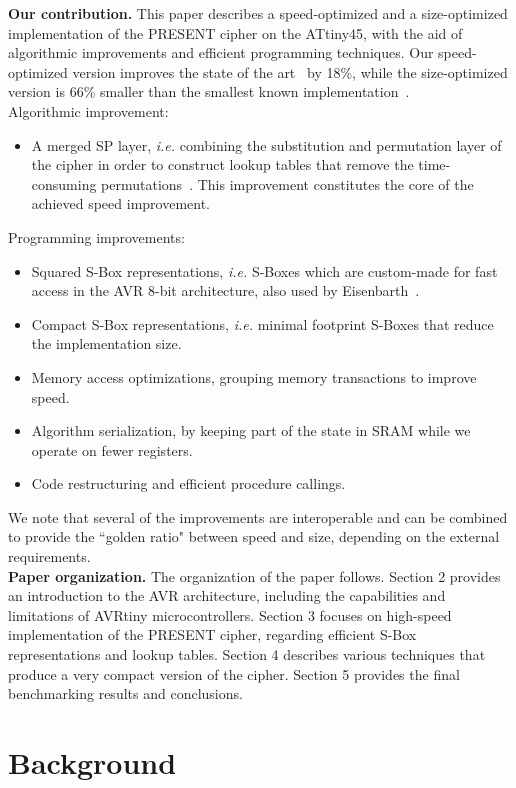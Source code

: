 \documentclass[11pt]{article}
\begin{document}
\textbf{Our contribution.} This paper describes a speed-optimized and a size-optimized implementation of the PRESENT cipher on the ATtiny45, with the aid of algorithmic improvements and efficient programming techniques. Our speed-optimized version improves the state of the art~\cite{eisenbarth2012compact} by 18\%, while the size-optimized version is 66\% smaller than the smallest known implementation~\cite{eisenbarth2012compact}.\\
Algorithmic improvement:
\begin{itemize}[nolistsep]
  \item A merged SP layer, \emph{i.e.} combining the substitution and permutation layer of the cipher in order to construct lookup tables that remove the time-consuming permutations~\cite{gong_code}. This improvement constitutes the core of the achieved speed improvement.
\end{itemize}
Programming improvements:
\begin{itemize}[nolistsep]
  \item Squared S-Box representations, \emph{i.e.} S-Boxes which are custom-made for fast access in the AVR 8-bit architecture, also used by Eisenbarth~\cite{eisenbarth2012compact}.
  \item Compact S-Box representations, \emph{i.e.} minimal footprint S-Boxes that reduce the implementation size.
  \item Memory access optimizations, grouping memory transactions to improve speed.
  \item Algorithm serialization, by keeping part of the state in SRAM while we operate on fewer registers.
  \item Code restructuring and efficient procedure callings.
\end{itemize}
We note that several of the improvements are interoperable and can be combined to provide the ``golden ratio" between speed and size, depending on the external requirements.\\
\textbf{Paper organization.} The organization of the paper follows. Section 2 provides an introduction to the AVR architecture, including the capabilities and limitations of AVRtiny microcontrollers. Section 3 focuses on high-speed implementation of the PRESENT cipher, regarding efficient S-Box representations and lookup tables. Section 4 describes various techniques that produce a very compact version of the cipher. Section 5 provides the final benchmarking results and conclusions.

\section{Background}
\end{document}
